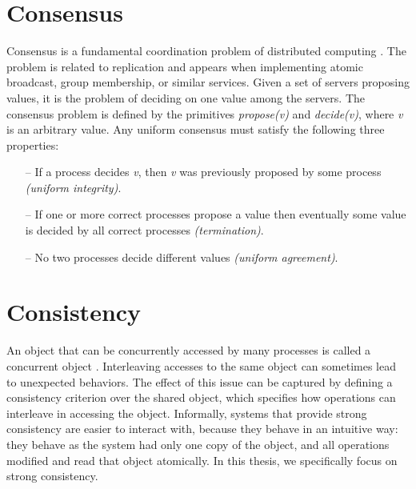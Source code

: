 \section{Consensus}
\label{sec:consensus}
Consensus is a fundamental coordination problem of distributed computing
\cite{Lam78, santos2013htsmr}. The problem is related to replication and appears
when implementing atomic broadcast, group membership, or similar services. Given
a set of servers proposing values, it is the problem of deciding on one value
among the servers. The consensus problem is defined by the primitives
\emph{propose(v)} and \emph{decide(v)}, where \emph{v} is an arbitrary value.
Any uniform consensus must satisfy the following three properties:
\begin{itemize}

  \item[--] If a process decides \emph{v}, then \emph{v} was previously
  proposed by some process \emph{(uniform integrity)}.

  \item[--] If one or more correct processes propose a value then eventually
  some value is decided by all correct processes \emph{(termination)}.

  \item[--] No two processes decide different values \emph{(uniform agreement)}.

\end{itemize}

\section{Consistency}
An object that can be concurrently accessed by many processes is called a
concurrent object \cite{linearizability}. Interleaving accesses to the same
object can sometimes lead to unexpected behaviors. The effect of this issue can
be captured by defining a consistency criterion over the shared object, which
specifies how operations can interleave in accessing the object.
Informally, systems that provide strong consistency are easier to interact with,
because they behave in an intuitive way: they behave as the system had only one
copy of the object, and all operations modified and read that object atomically.
In this thesis, we specifically focus on strong consistency.

